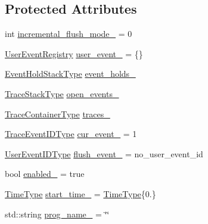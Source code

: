 \subsection*{Protected Attributes}
\begin{DoxyCompactItemize}
\item 
int \hyperlink{structvt_1_1trace_1_1_trace_lite_a0f5139a30b7eef896d0b49b22b97fec3}{incremental\+\_\+flush\+\_\+mode\+\_\+} = 0
\item 
\hyperlink{structvt_1_1trace_1_1_user_event_registry}{User\+Event\+Registry} \hyperlink{structvt_1_1trace_1_1_trace_lite_a7dcadada68a0b250898d7838de01458b}{user\+\_\+event\+\_\+} = \{\}
\item 
\hyperlink{structvt_1_1trace_1_1_trace_lite_af9e05e83b3d0adfb9d45cf13c0bb7525}{Event\+Hold\+Stack\+Type} \hyperlink{structvt_1_1trace_1_1_trace_lite_a323d77bc03ed78b44e632c595433b7ba}{event\+\_\+holds\+\_\+}
\item 
\hyperlink{structvt_1_1trace_1_1_trace_lite_ae827dd1c4f37ac2dbcb6f4898a664b99}{Trace\+Stack\+Type} \hyperlink{structvt_1_1trace_1_1_trace_lite_a11cf264af89fe8dd3703e8897d0bb77b}{open\+\_\+events\+\_\+}
\item 
\hyperlink{structvt_1_1trace_1_1_trace_lite_a346a7751a544de425345a8983ed52146}{Trace\+Container\+Type} \hyperlink{structvt_1_1trace_1_1_trace_lite_a3751cf984ddc83e14f120daf5d533a2c}{traces\+\_\+}
\item 
\hyperlink{namespacevt_1_1trace_a64a7185f3e102df8d8258f263ccd1582}{Trace\+Event\+I\+D\+Type} \hyperlink{structvt_1_1trace_1_1_trace_lite_a06815b5d345c41f07105dd382b4c3c2b}{cur\+\_\+event\+\_\+} = 1
\item 
\hyperlink{namespacevt_1_1trace_a5908920d051c144c89f17c69ed262350}{User\+Event\+I\+D\+Type} \hyperlink{structvt_1_1trace_1_1_trace_lite_acba836a9cc25aee679f7738c8f2721eb}{flush\+\_\+event\+\_\+} = no\+\_\+user\+\_\+event\+\_\+id
\item 
bool \hyperlink{structvt_1_1trace_1_1_trace_lite_a414bdf6f5d6e031264b392aed0e8e320}{enabled\+\_\+} = true
\item 
\hyperlink{namespacevt_a2b9f28078dc309ad0706b69ded743e69}{Time\+Type} \hyperlink{structvt_1_1trace_1_1_trace_lite_a1b9c0ddc603e70b5fc86eea866aaa67d}{start\+\_\+time\+\_\+} = \hyperlink{namespacevt_a2b9f28078dc309ad0706b69ded743e69}{Time\+Type}\{0.\}
\item 
std\+::string \hyperlink{structvt_1_1trace_1_1_trace_lite_a8bd3836d6fad28bb428ce3b824a00595}{prog\+\_\+name\+\_\+} = \char`\"{}\char`\"{}
\item 

\end{DoxyCompactItemize}
